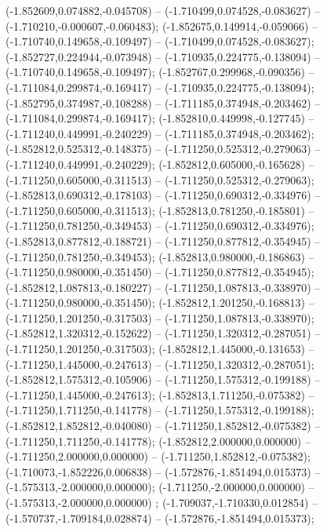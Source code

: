  (-1.852609,0.074882,-0.045708) -- (-1.710499,0.074528,-0.083627) -- (-1.710210,-0.000607,-0.060483);
 (-1.852675,0.149914,-0.059066) -- (-1.710740,0.149658,-0.109497) -- (-1.710499,0.074528,-0.083627);
 (-1.852727,0.224944,-0.073948) -- (-1.710935,0.224775,-0.138094) -- (-1.710740,0.149658,-0.109497);
 (-1.852767,0.299968,-0.090356) -- (-1.711084,0.299874,-0.169417) -- (-1.710935,0.224775,-0.138094);
 (-1.852795,0.374987,-0.108288) -- (-1.711185,0.374948,-0.203462) -- (-1.711084,0.299874,-0.169417);
 (-1.852810,0.449998,-0.127745) -- (-1.711240,0.449991,-0.240229) -- (-1.711185,0.374948,-0.203462);
 (-1.852812,0.525312,-0.148375) -- (-1.711250,0.525312,-0.279063) -- (-1.711240,0.449991,-0.240229);
 (-1.852812,0.605000,-0.165628) -- (-1.711250,0.605000,-0.311513) -- (-1.711250,0.525312,-0.279063);
 (-1.852813,0.690312,-0.178103) -- (-1.711250,0.690312,-0.334976) -- (-1.711250,0.605000,-0.311513);
 (-1.852813,0.781250,-0.185801) -- (-1.711250,0.781250,-0.349453) -- (-1.711250,0.690312,-0.334976);
 (-1.852813,0.877812,-0.188721) -- (-1.711250,0.877812,-0.354945) -- (-1.711250,0.781250,-0.349453);
 (-1.852813,0.980000,-0.186863) -- (-1.711250,0.980000,-0.351450) -- (-1.711250,0.877812,-0.354945);
 (-1.852812,1.087813,-0.180227) -- (-1.711250,1.087813,-0.338970) -- (-1.711250,0.980000,-0.351450);
 (-1.852812,1.201250,-0.168813) -- (-1.711250,1.201250,-0.317503) -- (-1.711250,1.087813,-0.338970);
 (-1.852812,1.320312,-0.152622) -- (-1.711250,1.320312,-0.287051) -- (-1.711250,1.201250,-0.317503);
 (-1.852812,1.445000,-0.131653) -- (-1.711250,1.445000,-0.247613) -- (-1.711250,1.320312,-0.287051);
 (-1.852812,1.575312,-0.105906) -- (-1.711250,1.575312,-0.199188) -- (-1.711250,1.445000,-0.247613);
 (-1.852813,1.711250,-0.075382) -- (-1.711250,1.711250,-0.141778) -- (-1.711250,1.575312,-0.199188);
 (-1.852812,1.852812,-0.040080) -- (-1.711250,1.852812,-0.075382) -- (-1.711250,1.711250,-0.141778);
 (-1.852812,2.000000,0.000000) -- (-1.711250,2.000000,0.000000) -- (-1.711250,1.852812,-0.075382);
 (-1.710073,-1.852226,0.006838) -- (-1.572876,-1.851494,0.015373) -- (-1.575313,-2.000000,0.000000);
 (-1.711250,-2.000000,0.000000) -- (-1.575313,-2.000000,0.000000) ;
 (-1.709037,-1.710330,0.012854) -- (-1.570737,-1.709184,0.028874) -- (-1.572876,-1.851494,0.015373);
